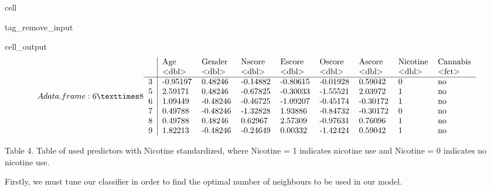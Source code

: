 \documentclass[letterpaper,10pt,english]{jupyterBook}
\begin{document}
\begin{sphinxuseclass}{cell}
\begin{sphinxuseclass}{tag_remove_input}\begin{sphinxVerbatimOutput}

\begin{sphinxuseclass}{cell_output}\begin{equation*}
\begin{split}A data.frame: 6 × 8
\begin{tabular}{r|llllllll}
  & Age & Gender & Nscore & Escore & Oscore & Ascore & Nicotine & Cannabis\\
  & <dbl> & <dbl> & <dbl> & <dbl> & <dbl> & <dbl> & <dbl> & <fct>\\
\hline
	3 & -0.95197 &  0.48246 & -0.14882 & -0.80615 & -0.01928 &  0.59042 & 0 & no\\
	5 &  2.59171 &  0.48246 & -0.67825 & -0.30033 & -1.55521 &  2.03972 & 1 & no\\
	6 &  1.09449 & -0.48246 & -0.46725 & -1.09207 & -0.45174 & -0.30172 & 1 & no\\
	7 &  0.49788 & -0.48246 & -1.32828 &  1.93886 & -0.84732 & -0.30172 & 0 & no\\
	8 &  0.49788 &  0.48246 &  0.62967 &  2.57309 & -0.97631 &  0.76096 & 1 & no\\
	9 &  1.82213 & -0.48246 & -0.24649 &  0.00332 & -1.42424 &  0.59042 & 1 & no\\
\end{tabular}\end{split}
\end{equation*}
\end{sphinxuseclass}\end{sphinxVerbatimOutput}

\end{sphinxuseclass}
\end{sphinxuseclass}
\sphinxAtStartPar
Table 4. Table of used predictors with Nicotine standardized, where Nicotine = 1 indicates nicotine use and Nicotine = 0 indicates no nicotine use.

\begin{DUlineblock}{0em}
\item[] 
\end{DUlineblock}

\sphinxAtStartPar
Firstly, we must tune our classifier in order to find the optimal number of neighbours to be used in our model.
\end{document}
